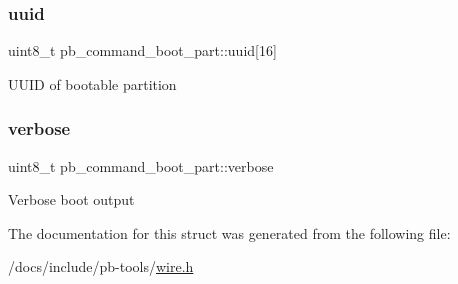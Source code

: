 \subsubsection{\texorpdfstring{uuid}{uuid}}
{\footnotesize\ttfamily uint8\+\_\+t pb\+\_\+command\+\_\+boot\+\_\+part\+::uuid\mbox{[}16\mbox{]}}

U\+U\+ID of bootable partition \mbox{\label{structpb__command__boot__part_abe5ac22da3fcb1fc93a8890a8e6862b4}} 
\subsubsection{\texorpdfstring{verbose}{verbose}}
{\footnotesize\ttfamily uint8\+\_\+t pb\+\_\+command\+\_\+boot\+\_\+part\+::verbose}

Verbose boot output 

The documentation for this struct was generated from the following file\+:\begin{DoxyCompactItemize}
\item 
/docs/include/pb-\/tools/\hyperlink{wire_8h}{wire.\+h}\end{DoxyCompactItemize}
